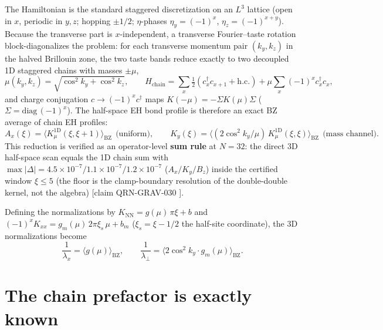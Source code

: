 \documentclass[aps,prb,preprint,nofootinbib]{revtex4-2}
\begin{document}
The Hamiltonian is the standard staggered discretization on an $L^3$ lattice
(open in $x$, periodic in $y,z$; hopping $\pm 1/2$; $\eta$-phases
$\eta_y = (-1)^x$, $\eta_z = (-1)^{x+y}$). Because the transverse part is
$x$-independent, a transverse Fourier--taste rotation block-diagonalizes the
problem: for each transverse momentum pair $(k_y,k_z)$ in the halved Brillouin
zone, the two taste bands reduce exactly to two decoupled 1D staggered chains
with masses $\pm\mu$,
\begin{equation}
\mu(k_y,k_z) = \sqrt{\cos^2 k_y + \cos^2 k_z},\qquad
H_{\mathrm{chain}} = \sum_x \tfrac12 (c^\dagger_x c_{x+1} + \mathrm{h.c.})
+ \mu \sum_x (-1)^x c^\dagger_x c_x,
\end{equation}
and charge conjugation $c \to (-1)^x c^\dagger$ maps
$K(-\mu) = -\Sigma K(\mu)\Sigma$ ($\Sigma = \mathrm{diag}\,(-1)^x$). The
half-space EH bond profile is therefore an exact BZ average of chain EH
profiles:
\begin{equation}
A_x(\xi) = \langle K^{\mathrm{1D}}_\mu(\xi,\xi+1)\rangle_{\mathrm{BZ}}
\ \ \text{(uniform)},\qquad
K_y(\xi) = \big\langle (2\cos^2 k_y/\mu)\, K^{\mathrm{1D}}_\mu(\xi,\xi)
\big\rangle_{\mathrm{BZ}}\ \ \text{(mass channel)}.
\end{equation}
This reduction is verified as an operator-level \textbf{sum rule} at $N=32$:
the direct 3D half-space scan equals the 1D chain sum with
$\max|\Delta| = 4.5\times10^{-7} / 1.1\times10^{-7} / 1.2\times10^{-7}$
($A_x/K_y/B_z$) inside the certified window $\xi \le 5$ (the floor is the
clamp-boundary resolution of the double-double kernel, not the algebra)
[claim QRN-GRAV-030 \cite{Repo}].

Defining the normalizations by $K_{\mathrm{NN}} = g(\mu)\,\pi\xi + b$ and
$(-1)^x K_{xx} = g_m(\mu)\,2\pi\xi_s\,\mu + b_m$ ($\xi_s = \xi - 1/2$ the
half-site coordinate), the 3D normalizations become
\begin{equation}
\boxed{\ \frac{1}{\lambda_x} = \langle g(\mu)\rangle_{\mathrm{BZ}},\qquad
\frac{1}{\lambda_\perp} = \langle 2\cos^2 k_y\cdot g_m(\mu)\rangle_{\mathrm{BZ}}.\ }
\end{equation}

\section{The chain prefactor is exactly known}
\end{document}
